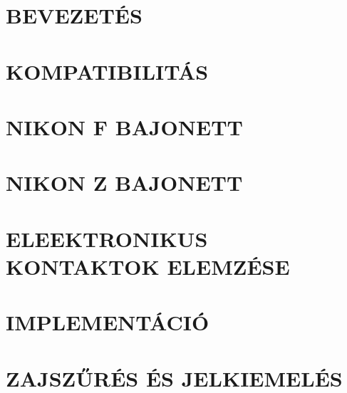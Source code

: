 








%

%
%
%


\newpage
\tableofcontents
\newpage





\clearpage
\section{BEVEZETÉS}

\clearpage
\section{KOMPATIBILITÁS}

\clearpage
\section{NIKON F BAJONETT}

\clearpage
\section{NIKON Z BAJONETT}

\clearpage
\section{ELEEKTRONIKUS KONTAKTOK ELEMZÉSE}

\clearpage
\section{IMPLEMENTÁCIÓ}

\clearpage
\section{ZAJSZŰRÉS ÉS JELKIEMELÉS}

\clearpage
